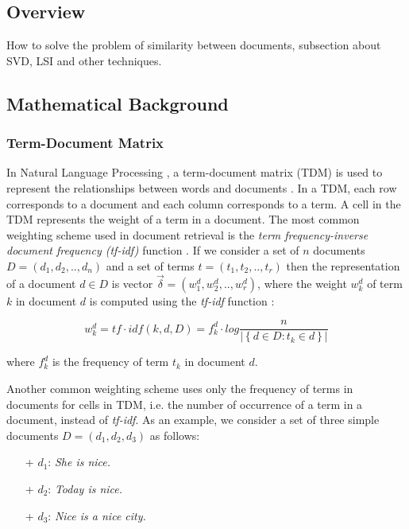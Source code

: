 \subsection{Overview}

How to solve the problem of similarity between documents, subsection about SVD, LSI and other techniques.

\subsection{Mathematical Background}


\subsubsection{Term-Document Matrix}
 In Natural Language Processing \cite{Collobert:2011:NLP:1953048.2078186}, a term-document matrix (TDM) is used to represent the relationships between words and documents \cite{Turney:2010:FMV:1861751.1861756}. In a TDM, each row corresponds to a document and each column corresponds to a term. A cell in the TDM represents the weight of a term in a document. The most common weighting scheme used in document retrieval is the \emph{term frequency-inverse document frequency (tf-idf)} function \cite{Reed:2006:TNT:1193211.1193734}. If we consider a set of $n$ documents $D=(d_{1},d_{2},..,d_{n})$ and a set of terms $t=(t_{1},t_{2},..,t_{r})$ then the representation of a document $d \in D $ is vector $\vec{\delta}=(w_{1}^{d},w_{2}^{d},..,w_{r}^{d})$, where the weight $w_{k}^{d}$ of term $k$ in document $d$ is computed using the {\em tf-idf} function \cite{Ramos1999}:

\begin{equation} \label{tfidf} %
w_{k}^{d} =tf\cdot idf(k,d,D)= f_{k}^{d}\cdot log\frac{n}{\left | \left \{ d\in D: t_{k} \in d \right \} \right |} 
\end{equation}

where $f_{k}^{d}$ is the frequency of term $t_{k}$ in document $d$.

Another common weighting scheme uses only the frequency of terms in documents for cells in TDM, i.e. the number of occurrence of a term in a document, instead of {\em tf-idf}. As an example, we consider a set of three simple documents $D=(d_{1},d_{2},d_{3})$ as follows:

\begin{itemize}
	\item[+] $d_{1}$: \emph{She is nice.}
	\item[+] $d_{2}$: \emph{Today is nice.}
	\item[+] $d_{3}$: \emph{Nice is a nice city.}
\end{itemize}

